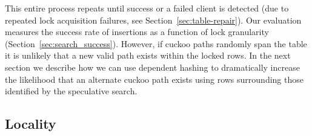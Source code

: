 This entire process repeats until success or a failed client is
detected (due to repeated lock acquisition failures, see
Section~\ref{sec:table-repair}).  Our evaluation measures the success
rate of insertions as a function of lock granularity
(Section~\ref{sec:search_success}).
However, if cuckoo paths randomly span the table it is unlikely that a
new valid path exists within the locked rows.  In the next section we
describe how we can use dependent hashing to dramatically increase the
likelihood that an alternate cuckoo path exists using rows surrounding
those identified by the speculative search.




\subsection{Locality}


